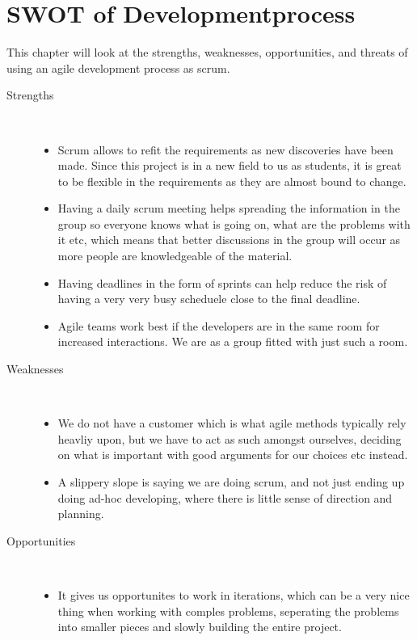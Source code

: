 \chapter{SWOT of Developmentprocess}
This chapter will look at the strengths, weaknesses, opportunities, and threats of using an agile development process as scrum.

\begin{description}
	\item [Strengths]\hfill\\
		\begin{itemize}
		\item Scrum allows to refit the requirements as new discoveries have been made. Since this project is in a new field to us as students, it is great to be flexible in the requirements as they are almost bound to change.
		\item Having a daily scrum meeting helps spreading the information in the group so everyone knows what is going on, what are the problems with it etc, which means that better discussions in the group will occur as more people are knowledgeable of the material.
		\item Having deadlines in the form of sprints can help reduce the risk of having a very very busy scheduele close to the final deadline.
		\item Agile teams work best if the developers are in the same room for increased interactions. We are as a group fitted with just such a room.
		\end{itemize}
	\item [Weaknesses]\hfill\\
		\begin{itemize}
		\item We do not have a customer which is what agile methods typically rely heavliy upon, but we have to act as such amongst ourselves, deciding on what is important with good arguments for our choices etc instead.
		\item A slippery slope is saying we are doing scrum, and not just ending up doing ad-hoc developing, where there is little sense of direction and planning.
		\end{itemize}
	\item [Opportunities]\hfill\\
		\begin{itemize}
		\item It gives us opportunites to work in iterations, which can be a very nice thing when working with comples problems, seperating the problems into smaller pieces and slowly building the entire project.

\end{itemize}
\end{description}
